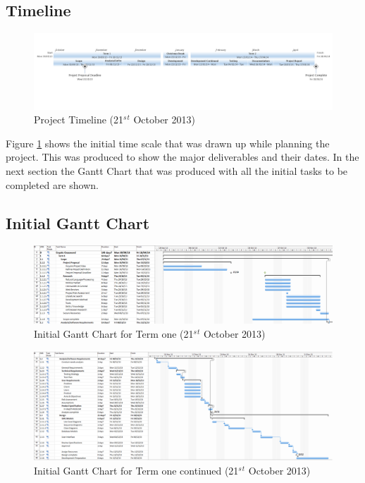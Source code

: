 \begin{landscape}

\subsection{Timeline}

\begin{figure}[H]
  \centering
  \includegraphics[width=\linewidth]{images/timeline1.png}
  \caption{Project Timeline (21$^s$$^t$ October 2013)}
  \label{fig:timeline1}
\end{figure}

Figure \ref{fig:timeline1} shows the initial time scale that was drawn up while
planning the project. This was produced to show the major deliverables and their
dates. In the next section the Gantt Chart that was produced with all the
initial tasks to be completed are shown.

 
\newpage
\subsection{Initial Gantt Chart}

\begin{figure}[H]
  \centering
  \includegraphics[width=\linewidth]{images/initial_term1_1.png}
  \caption{Initial Gantt Chart for Term one (21$^s$$^t$ October 2013)}
  \label{fig:ganttinitialterm11}
\end{figure}

\begin{figure}[H]
  \centering
  \includegraphics[width=\linewidth]{images/initial_term1_2.png}
  \caption{Initial Gantt Chart for Term one continued (21$^s$$^t$ October 2013)}
  \label{fig:ganttinitialterm12}
\end{figure}


\end{landscape}
